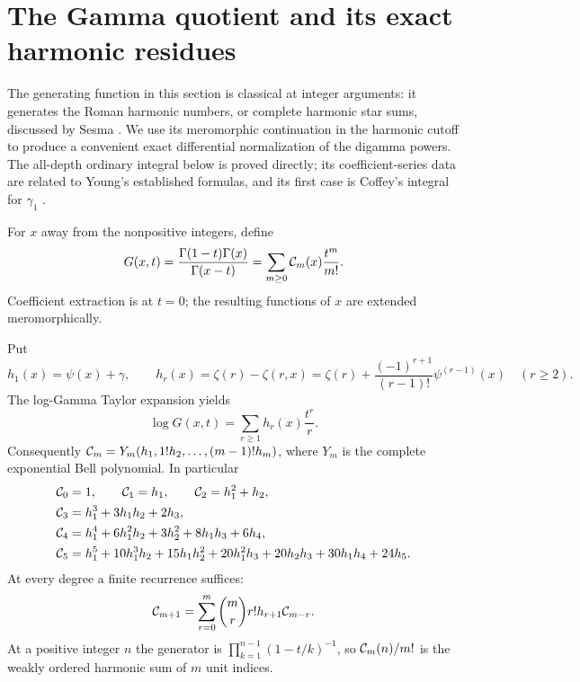 \section{The Gamma quotient and its exact harmonic residues}
\label{sec:gamma}

The generating function in this section is classical at integer
arguments: it generates the Roman harmonic numbers, or complete
harmonic star sums, discussed by Sesma \cite[Eq.~(49)]{Sesma}.
We use its meromorphic continuation in the harmonic cutoff to produce
a convenient exact differential normalization of the digamma powers.
The all-depth ordinary integral below is proved directly; its
coefficient-series data are related to Young's established formulas,
and its first case is Coffey's integral for $\gamma_1$
\cite[Eq.~(1.19)]{Coffey}.

\begin{definition}\label{def:Cm}
For $x$ away from the nonpositive integers, define
\begin{equation}\label{eq:GammaGenerator}
 G(x,t)=\frac{\Gamma(1-t)\Gamma(x)}{\Gamma(x-t)}
       =\sum_{m\ge0}\mathcal C_m(x)\frac{t^m}{m!}.
\end{equation}
Coefficient extraction is at $t=0$; the resulting functions of $x$
are extended meromorphically.
\end{definition}

Put
\begin{equation}\label{eq:hr}
 h_1(x)=\psi(x)+\gamma,\qquad
 h_r(x)=\zeta(r)-\zeta(r,x)
       =\zeta(r)+\frac{(-1)^{r+1}}{(r-1)!}\psi^{(r-1)}(x)
       \quad(r\ge2).
\end{equation}
The log-Gamma Taylor expansion yields
\begin{equation}\label{eq:logG}
 \log G(x,t)=\sum_{r\ge1}h_r(x)\frac{t^r}{r}.
\end{equation}
Consequently $\mathcal C_m=Y_m(h_1,1!h_2,\ldots,(m-1)!h_m)$,
where $Y_m$ is the complete exponential Bell polynomial. In particular
\begin{align}
 \mathcal C_0&=1,\qquad \mathcal C_1=h_1,\qquad
 \mathcal C_2=h_1^2+h_2,\\
 \mathcal C_3&=h_1^3+3h_1h_2+2h_3,\\
 \mathcal C_4&=h_1^4+6h_1^2h_2+3h_2^2+8h_1h_3+6h_4,\\
 \mathcal C_5&=h_1^5+10h_1^3h_2+15h_1h_2^2+20h_1^2h_3
                +20h_2h_3+30h_1h_4+24h_5.
 \label{eq:Cfirst}
\end{align}
At every degree a finite recurrence suffices:
\begin{equation}\label{eq:Crecurrence}
 \mathcal C_{m+1}=
 \sum_{r=0}^m\binom mr r!h_{r+1}\mathcal C_{m-r}.
\end{equation}
At a positive integer $n$ the generator is
$\prod_{k=1}^{n-1}(1-t/k)^{-1}$, so $\mathcal C_m(n)/m!$ is the
weakly ordered harmonic sum of $m$ unit indices.

